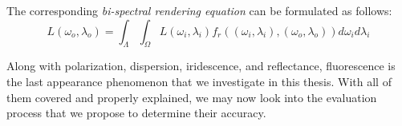 The corresponding \emph{bi-spectral rendering equation} can be formulated as follows:
\begin{equation}
L(\omega_o,\lambda_o)=\int_{\Lambda}\int_{\Omega}L(\omega_i,\lambda_i)f_r((\omega_i,\lambda_i),(\omega_o,\lambda_o))d\omega_i d\lambda_i
\end{equation}

Along with polarization, dispersion, iridescence, and reflectance, fluorescence is the last appearance phenomenon that we investigate in this thesis. With all of them covered and properly explained, we may now look into the evaluation process that we propose to determine their accuracy.